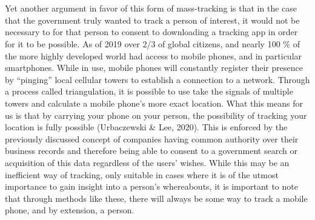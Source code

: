 \documentclass[11pt]{article}
\begin{document}
\\ \\
Yet another argument in favor of this form of mass-tracking is that in the case that the government truly wanted to track a person of interest, it would not be necessary to for that person to consent to downloading a tracking app in order for it to be possible.
As of 2019 over 2/3 of global citizens, and nearly 100 $\%$ of the more highly developed world had access to mobile phones, and in particular smartphones. While in use, mobile phones will constantly register their presence by “pinging” local cellular towers to establish a connection to a network. Through a process called triangulation, it is possible to use take the signals of multiple towers and calculate a mobile phone’s more exact location. What this means for us is that by carrying your phone on your person, the possibility of tracking your location is fully possible (Urbaczewski \& Lee, 2020). This is enforced by the previously discussed concept of companies having common authority over their business records and therefore being able to consent to a government search or acquisition of this data regardless of the users’ wishes. 
While this may be an inefficient way of tracking, only suitable in cases where it is of the utmost importance to gain insight into a person’s whereabouts, it is important to note that through methods like these, there will always be some way to track a mobile phone, and by extension, a person.
\\
\end{document}
